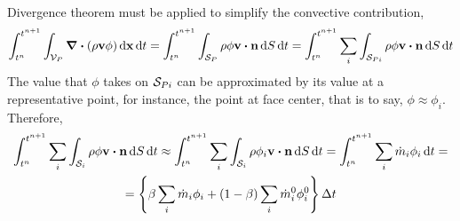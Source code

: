 Divergence theorem must be applied to simplify the convective contribution,
\begin{equation} 
	\int_{t^n}^{t^{n+1}} \int_{\cv{P}} \div(\rho \vb{v} \phi) \dd{\vb{x}} \dd{t} = 
	\int_{t^n}^{t^{n+1}} \int_{\cs{P}} \rho \phi \vb{v} \vdot \vb{n} \dd{S} \dd{t} = 
	\int_{t^n}^{t^{n+1}} \sum_i \int_{\cs{Pi}} \rho \phi \vb{v} \vdot \vb{n} \dd{S} \dd{t}
\end{equation}
The value that $\phi$ takes on $\mathcal{S}_{Pi}$ can be approximated by its value at a representative point, for instance, the point at face center, that is to say, $\phi \approx \phi_i$. Therefore,
\begin{multline}
	\int_{t^n}^{t^{n+1}} \sum_i \int_{\mathcal{S}_i} \rho \phi \vb{v} \vdot \vb{n} \dd{S} \dd{t} \approx 
	\int_{t^n}^{t^{n+1}} \sum_i \int_{\mathcal{S}_i} \rho \phi_i \vb{v} \vdot \vb{n} \dd{S} \dd{t} =
	\int_{t^n}^{t^{n+1}} \sum_i \dot{m}_i \phi_i \dd{t} = \\
	= \left\{ \beta \sum_i \dot{m}_i \phi_i + (1 - \beta) \sum_i \dot{m}_i^0 \phi_i^0 \right\} \Delta t	
\end{multline}

